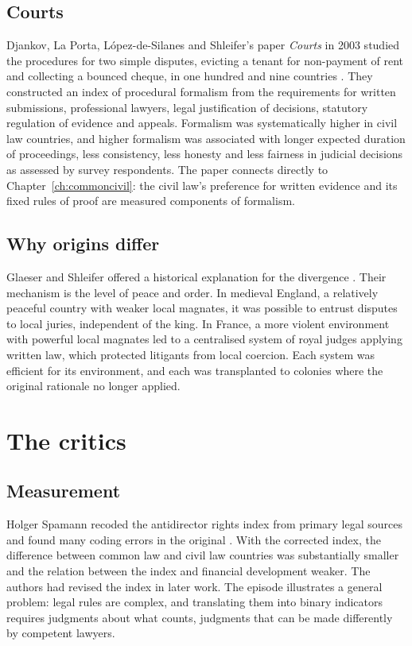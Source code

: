 \subsection{Courts}

Djankov, La Porta, L\'opez-de-Silanes and Shleifer's paper \emph{Courts} in 2003 studied the procedures for two simple disputes, evicting a tenant for non-payment of rent and collecting a bounced cheque, in one hundred and nine countries \citep{djankov2003}. They constructed an index of procedural formalism from the requirements for written submissions, professional lawyers, legal justification of decisions, statutory regulation of evidence and appeals. Formalism was systematically higher in civil law countries, and higher formalism was associated with longer expected duration of proceedings, less consistency, less honesty and less fairness in judicial decisions as assessed by survey respondents. The paper connects directly to Chapter~\ref{ch:commoncivil}: the civil law's preference for written evidence and its fixed rules of proof are measured components of formalism.

\subsection{Why origins differ}

Glaeser and Shleifer offered a historical explanation for the divergence \citep{glaeser2002}. Their mechanism is the level of peace and order. In medieval England, a relatively peaceful country with weaker local magnates, it was possible to entrust disputes to local juries, independent of the king. In France, a more violent environment with powerful local magnates led to a centralised system of royal judges applying written law, which protected litigants from local coercion. Each system was efficient for its environment, and each was transplanted to colonies where the original rationale no longer applied.

\section{The critics}

\subsection{Measurement}

Holger Spamann recoded the antidirector rights index from primary legal sources and found many coding errors in the original \citep{spamann2010}. With the corrected index, the difference between common law and civil law countries was substantially smaller and the relation between the index and financial development weaker. The authors had revised the index in later work. The episode illustrates a general problem: legal rules are complex, and translating them into binary indicators requires judgments about what counts, judgments that can be made differently by competent lawyers.

